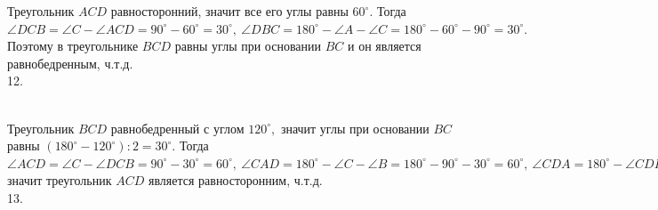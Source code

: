 \documentclass[12pt]{article}
\begin{document}
Треугольник $ACD$ равносторонний, значит все его углы равны $60^\circ.$ Тогда $\angle DCB=\angle C-\angle ACD=90^\circ-60^\circ=30^\circ,\ \angle DBC=180^\circ-\angle A-\angle C=180^\circ-60^\circ-90^\circ=30^\circ.$ Поэтому в треугольнике $BCD$ равны углы при основании $BC$ и он является равнобедренным, ч.т.д.\\
12. \begin{figure}[ht!]
\end{figure}\\
Треугольник $BCD$ равнобедренный с углом $120^\circ,$ значит углы при основании $BC$ равны $(180^\circ-120^\circ):2=30^\circ.$ Тогда $\angle ACD=\angle C-\angle DCB=90^\circ-30^\circ=60^\circ,\ \angle CAD=180^\circ-\angle C-\angle B=180^\circ-90^\circ-30^\circ=60^\circ,\ \angle CDA=180^\circ-\angle CDB=180^\circ-120^\circ=60^\circ,$
значит треугольник $ACD$ является равносторонним, ч.т.д.\\
13. \begin{figure}[ht!]
\end{figure}\\
\end{document}
